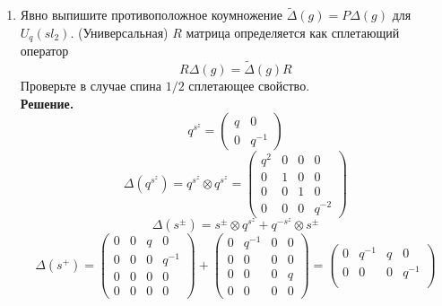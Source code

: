 \documentclass[12pt]{article}
\theoremstyle{definition}
\begin{document}
\begin{enumerate}
\begin{enumerate}
    \end{enumerate}
    \item Явно выпишите противоположное коумножение $\tilde\Delta(g)=P\Delta(g)$ для $U_q(sl_2)$. (Универсальная) $R$ матрица определяется как сплетающий оператор
    \begin{equation}
        R\Delta(g)=\tilde\Delta(g)R
    \end{equation}
    Проверьте в случае спина $1/2$ сплетающее свойство.\\
    \textbf{Решение.}\\
    \begin{equation}
        q^{s^z}=\begin{pmatrix}
            q & 0\\
            0 & q^{-1}
        \end{pmatrix}
    \end{equation}
    \begin{equation}
        \Delta(q^{s^z})=q^{s^z}\otimes q^{s^z}=\begin{pmatrix}
            q^2 & 0 & 0 & 0\\
            0 & 1 & 0 & 0\\
            0 & 0 & 1 & 0\\
            0 & 0 & 0 & q^{-2}
        \end{pmatrix}
    \end{equation}
    \begin{equation}
        \Delta(s^\pm)=s^\pm\otimes q^{s^z}+q^{-s^z}\otimes s^\pm
    \end{equation}
    \begin{equation}
        \Delta(s^+)=\begin{pmatrix}
            0 & 0 & q & 0\\
            0 & 0 & 0 & q^{-1}\\
            0 & 0 & 0 & 0\\
            0 & 0 & 0 & 0
        \end{pmatrix}+\begin{pmatrix}
            0 & q^{-1} & 0 & 0\\
            0 & 0 & 0 & 0\\
            0 & 0 & 0 & q\\
            0 & 0 & 0 & 0
        \end{pmatrix}=\begin{pmatrix}
            0 & q^{-1} & q & 0\\
            0 & 0 & 0 & q^{-1}\\

\end{pmatrix}
\end{equation}
\end{enumerate}
\end{document}

